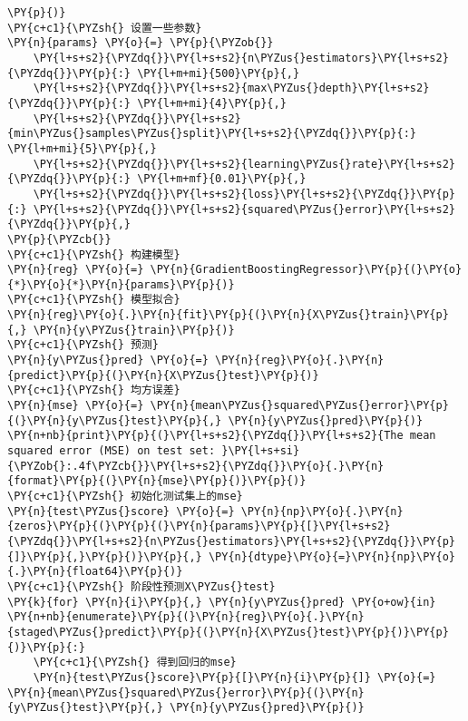 \begin{Verbatim}[commandchars=\\\{\}]
\PY{p}{)}
\PY{c+c1}{\PYZsh{} 设置一些参数}
\PY{n}{params} \PY{o}{=} \PY{p}{\PYZob{}}
    \PY{l+s+s2}{\PYZdq{}}\PY{l+s+s2}{n\PYZus{}estimators}\PY{l+s+s2}{\PYZdq{}}\PY{p}{:} \PY{l+m+mi}{500}\PY{p}{,}
    \PY{l+s+s2}{\PYZdq{}}\PY{l+s+s2}{max\PYZus{}depth}\PY{l+s+s2}{\PYZdq{}}\PY{p}{:} \PY{l+m+mi}{4}\PY{p}{,}
    \PY{l+s+s2}{\PYZdq{}}\PY{l+s+s2}{min\PYZus{}samples\PYZus{}split}\PY{l+s+s2}{\PYZdq{}}\PY{p}{:} \PY{l+m+mi}{5}\PY{p}{,}
    \PY{l+s+s2}{\PYZdq{}}\PY{l+s+s2}{learning\PYZus{}rate}\PY{l+s+s2}{\PYZdq{}}\PY{p}{:} \PY{l+m+mf}{0.01}\PY{p}{,}
    \PY{l+s+s2}{\PYZdq{}}\PY{l+s+s2}{loss}\PY{l+s+s2}{\PYZdq{}}\PY{p}{:} \PY{l+s+s2}{\PYZdq{}}\PY{l+s+s2}{squared\PYZus{}error}\PY{l+s+s2}{\PYZdq{}}\PY{p}{,}
\PY{p}{\PYZcb{}}
\PY{c+c1}{\PYZsh{} 构建模型}
\PY{n}{reg} \PY{o}{=} \PY{n}{GradientBoostingRegressor}\PY{p}{(}\PY{o}{*}\PY{o}{*}\PY{n}{params}\PY{p}{)}
\PY{c+c1}{\PYZsh{} 模型拟合}
\PY{n}{reg}\PY{o}{.}\PY{n}{fit}\PY{p}{(}\PY{n}{X\PYZus{}train}\PY{p}{,} \PY{n}{y\PYZus{}train}\PY{p}{)}
\PY{c+c1}{\PYZsh{} 预测}
\PY{n}{y\PYZus{}pred} \PY{o}{=} \PY{n}{reg}\PY{o}{.}\PY{n}{predict}\PY{p}{(}\PY{n}{X\PYZus{}test}\PY{p}{)}
\PY{c+c1}{\PYZsh{} 均方误差}
\PY{n}{mse} \PY{o}{=} \PY{n}{mean\PYZus{}squared\PYZus{}error}\PY{p}{(}\PY{n}{y\PYZus{}test}\PY{p}{,} \PY{n}{y\PYZus{}pred}\PY{p}{)}
\PY{n+nb}{print}\PY{p}{(}\PY{l+s+s2}{\PYZdq{}}\PY{l+s+s2}{The mean squared error (MSE) on test set: }\PY{l+s+si}{\PYZob{}:.4f\PYZcb{}}\PY{l+s+s2}{\PYZdq{}}\PY{o}{.}\PY{n}{format}\PY{p}{(}\PY{n}{mse}\PY{p}{)}\PY{p}{)}
\PY{c+c1}{\PYZsh{} 初始化测试集上的mse}
\PY{n}{test\PYZus{}score} \PY{o}{=} \PY{n}{np}\PY{o}{.}\PY{n}{zeros}\PY{p}{(}\PY{p}{(}\PY{n}{params}\PY{p}{[}\PY{l+s+s2}{\PYZdq{}}\PY{l+s+s2}{n\PYZus{}estimators}\PY{l+s+s2}{\PYZdq{}}\PY{p}{]}\PY{p}{,}\PY{p}{)}\PY{p}{,} \PY{n}{dtype}\PY{o}{=}\PY{n}{np}\PY{o}{.}\PY{n}{float64}\PY{p}{)}
\PY{c+c1}{\PYZsh{} 阶段性预测X\PYZus{}test}
\PY{k}{for} \PY{n}{i}\PY{p}{,} \PY{n}{y\PYZus{}pred} \PY{o+ow}{in} \PY{n+nb}{enumerate}\PY{p}{(}\PY{n}{reg}\PY{o}{.}\PY{n}{staged\PYZus{}predict}\PY{p}{(}\PY{n}{X\PYZus{}test}\PY{p}{)}\PY{p}{)}\PY{p}{:}
    \PY{c+c1}{\PYZsh{} 得到回归的mse}
    \PY{n}{test\PYZus{}score}\PY{p}{[}\PY{n}{i}\PY{p}{]} \PY{o}{=} \PY{n}{mean\PYZus{}squared\PYZus{}error}\PY{p}{(}\PY{n}{y\PYZus{}test}\PY{p}{,} \PY{n}{y\PYZus{}pred}\PY{p}{)}


\end{Verbatim}
